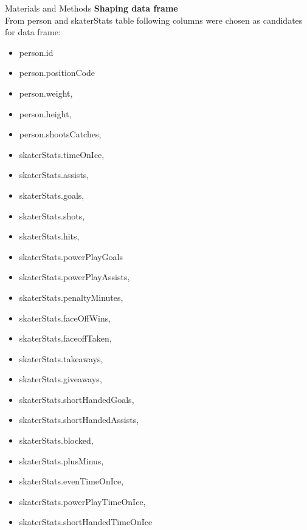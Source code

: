 \begin{frame}{Materials and Methods}
    \textbf{Shaping data frame}\\
    \vspace{2em}
    From person and skaterStats table following columns were chosen as candidates for data frame:\\
    \begin{minipage}[t]{0.45\textwidth}
        \begin{itemize}
            \item person.id
            \item person.positionCode
            \item person.weight,
            \item person.height,
            \item person.shootsCatches,
            \item skaterStats.timeOnIce,
            \item skaterStats.assists,
            \item skaterStats.goals,
            \item skaterStats.shots,
            \item skaterStats.hits,
            \item skaterStats.powerPlayGoals
            \item skaterStats.powerPlayAssists,
        \end{itemize}
    \end{minipage}
    \begin{minipage}[t]{0.45\textwidth}
        \begin{itemize}
            \item skaterStats.penaltyMinutes,
            \item skaterStats.faceOffWins,
            \item skaterStats.faceoffTaken,
            \item skaterStats.takeaways,
            \item skaterStats.giveaways,
            \item skaterStats.shortHandedGoals,
            \item skaterStats.shortHandedAssists,
            \item skaterStats.blocked,
            \item skaterStats.plusMinus,
            \item skaterStats.evenTimeOnIce,
            \item skaterStats.powerPlayTimeOnIce,
            \item skaterStats.shortHandedTimeOnIce
        \end{itemize}
    \end{minipage}
\end{frame} 

